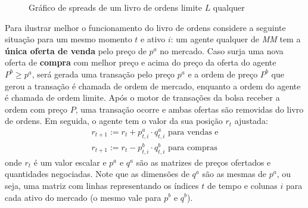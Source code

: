 \begin{figure}[H]
	\begin{center}
	\end{center}
	\caption{Gráfico de spreads de um livro de ordens limite $L$ qualquer}
\end{figure}

Para ilustrar melhor o funcionamento do livro de ordens considere a seguinte situação para um mesmo momento $t$ e ativo $i$: um agente qualquer de \textit{MM} tem a \textbf{única oferta de venda} pelo preço de $p^{a}$ no mercado. Caso surja uma nova oferta de \textbf{compra} com melhor preço e acima do preço da oferta do agente $P^{b} \geq p^{a}$, será gerada uma transação pelo preço $p^{a}$ e a ordem de preço $P^{b}$ que gerou a transação é chamada de ordem de mercado, enquanto a ordem do agente é chamada de ordem limite. Após o motor de transações da bolsa receber a ordem com preço $P$, uma transação ocorre e ambas ofertas são removidas do livro de ordens. Em seguida, o agente tem o valor da sua posição $r_{t}$ ajustada:
\begin{equation}
    \begin{aligned}
    	r_{t + 1}:= r_{t} + p^{a}_{t, i} \cdot q^{a}_{t, i} \text{ para vendas e} \\ 
    	r_{t + 1}:= r_{t} - p^{b}_{t, i} \cdot q^{b}_{t, i} \text{ para compras}
    \end{aligned}
\end{equation}
onde $r_{t}$ é um valor escalar e $p^{a}$ e $q^{a}$ são as matrizes de preços ofertados e quantidades negociadas. Note que as dimensões de $q^{a}$ são as mesmas de $p^{a}$, ou seja, uma matriz com linhas representando os índices $t$ de tempo e colunas $i$ para cada ativo do mercado (o mesmo vale para $p^{b}$ e $q^{b}$).


